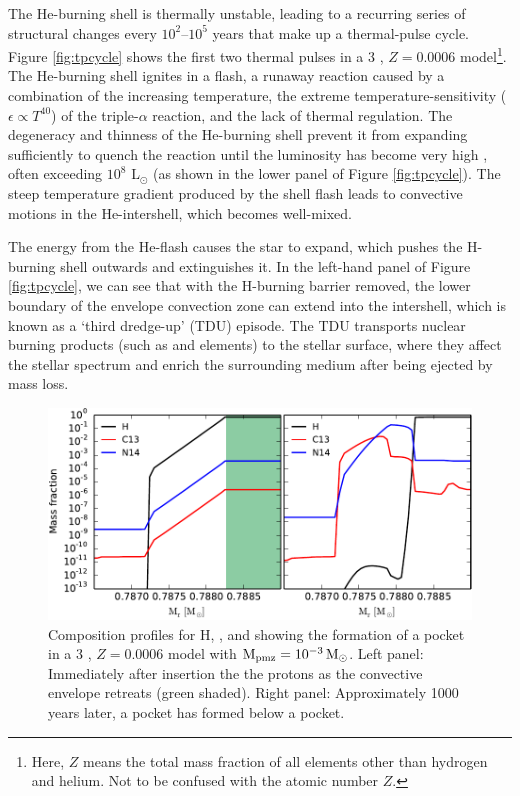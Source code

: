 The He-burning shell is thermally unstable, leading to a recurring series of structural changes every $10^2$--$10^5$ years that make up a thermal-pulse cycle. Figure \ref{fig:tpcycle} shows the first two thermal pulses in a 3 \Msun, $Z = 0.0006$ model\footnote{Here, $Z$ means the total mass fraction of all elements other than hydrogen and helium. Not to be confused with the atomic number $Z$.}. The He-burning shell ignites in a flash, a runaway reaction caused by a combination of the increasing temperature, the extreme temperature-sensitivity ($\epsilon \propto T^{40}$) of the triple-$\alpha$ reaction, and the lack of thermal regulation. The degeneracy and thinness of the He-burning shell prevent it from expanding sufficiently to quench the reaction until the luminosity has become very high \citep{Schwarzschild:1965dy,Weigert:1966th,Rose:1966bu}, often exceeding $10^8$ L$_\odot$ (as shown in the lower panel of Figure \ref{fig:tpcycle}). The steep temperature gradient produced by the shell flash leads to convective motions in the He-intershell, which becomes well-mixed.

The energy from the He-flash causes the star to expand, which pushes the H-burning shell outwards and extinguishes it. In the left-hand panel of Figure \ref{fig:tpcycle}, we can see that with the H-burning barrier removed, the lower boundary of the envelope convection zone can extend into the intershell, which is known as a `third dredge-up' (TDU) episode. The TDU transports nuclear burning products (such as  and \sprocess elements) to the stellar surface, where they affect the stellar spectrum and enrich the surrounding medium after being ejected by mass loss.

\begin{figure}
 \begin{center}\includegraphics[width=\textwidth]{fig-c13pocket}\end{center}
 \caption{Composition profiles for H, , and  showing the formation of a  pocket in a 3 \Msun, $Z=0.0006$ model with $\mathrm{M}_\mathrm{pmz}= 10^{-3}\,\mathrm{M}_{\odot}$. Left panel: Immediately after insertion the the protons as the convective envelope retreats (green shaded). Right panel: Approximately 1000 years later, a  pocket has formed below a  pocket.}\label{fig:c13pocket}
\end{figure}

